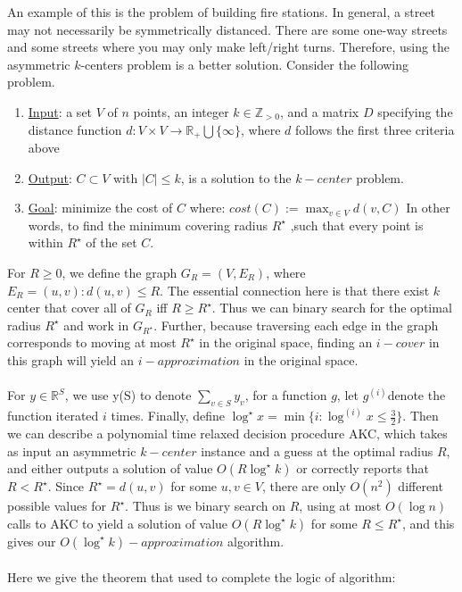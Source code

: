 An example of this is the problem of building fire stations. In general, a street may not necessarily be symmetrically distanced. There are some one-way streets and some streets where you may only make left/right turns. Therefore, using the asymmetric $k$-centers problem is a better solution. Consider the following problem.

\begin{enumerate}
\item \underline{Input}: a set $V$ of $n$ points, an integer $k\in\mathbb{Z}_{>0}$, and a matrix $D$ specifying the distance function $d:V\times V\rightarrow\mathbb{R}_+\bigcup\{\infty\}$, where $d$ follows the first three criteria above
\item \underline{Output}: $C\subset V$ with $\vert C \vert \leq k$, is a solution to the $k-center$ problem.
\item \underline{Goal}: minimize the cost of $C$ where: $cost(C):=\max_{v\in V}d(v, C)$ In other words, to find the minimum covering radius $R^\star$ ,such that every point is within $R^\star$ of the set $C$.
\end{enumerate}
For $R \geq 0$, we define the graph $G_R=(V,E_R)$, where $E_R = {(u,v):d(u,v)\leq R}.$ The essential connection here is that there exist $k$ center that cover all of $G_R$ iff $R \geq R^\star$. Thus we can binary search for the optimal radius $R^\star$ and work in $G_{R^\star}$. Further, because traversing each edge in the graph corresponds to moving at most $R^\star$ in the original space, finding an $i-cover$ in this graph will yield an $i-approximation$ in the original space.\\\\
For $y \in \mathbb{R}^S$, we use y(S) to denote $\sum_{v \in S} y_v$, for a function $g$, let $g^{(i)} $denote the function iterated $i$ times. Finally, define $\log^\star x= \min\{i:\log^{(i)}x\leq \frac 32\}$. Then we can describe a polynomial time relaxed decision procedure AKC, which takes as input an asymmetric $k-center$ instance and a guess at the optimal radius $R$, and either outputs a solution of value $O(R\log^\star k)$ or correctly reports that $R < R^\star$. Since $R^\star = d(u,v)$ for some $u,v \in V$, there are only $O(n^2)$ different possible values for $R^\star $. Thus is we binary search on $R$, using at most $O(\log n)$ calls to AKC to yield a solution of value $O(R\log^\star k)$ for some $R\leq R^\star$, and this gives our $O(\log^\star k)-approximation$  algorithm.\\\\
Here we give the theorem that used to complete the logic of algorithm:

